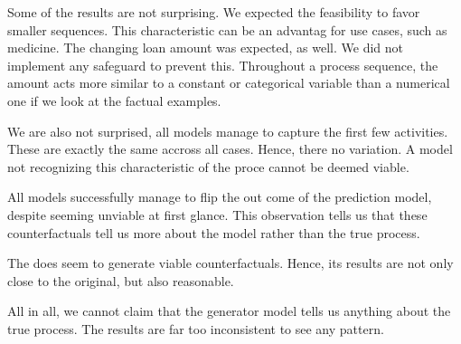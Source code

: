 \documentclass[./../../paper.tex]{subfiles}
\begin{document}
Some of the results are not surprising. We expected the feasibility to favor smaller sequences. This characteristic can be an advantag for use cases, such as medicine. The changing loan amount was expected, as well. We did not implement any safeguard to prevent this. Throughout a process sequence, the amount acts more similar to a constant or categorical variable than a numerical one if we look at the factual examples. 

We are also not surprised, all models manage to capture the first few activities. These are exactly the same accross all cases. Hence, there no variation. A model not recognizing this characteristic of the proce cannot be deemed viable.

All models successfully manage to flip the out come of the prediction model, despite seeming unviable at first glance. This observation tells us that these counterfactuals tell us more about the model rather than the true process. 

The \ModelCBG does seem to generate viable counterfactuals. Hence, its results are not only close to the original, but also reasonable.   

All in all, we cannot claim that the generator model tells us anything about the true process. The results are far too inconsistent to see any pattern. 
\end{document}

